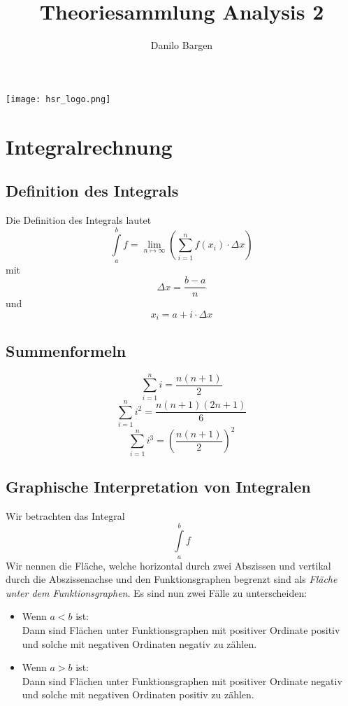 \documentclass[10pt,a4paper]{scrartcl}
\author{Danilo Bargen}
\title{Theoriesammlung Analysis 2}
\begin{document}
\begin{titlepage}
	\maketitle
	\vspace{120mm}
	\center\texttt{[image: hsr\_logo.png]}
	\thispagestyle{empty} %
\end{titlepage}

\tableofcontents\newpage

\section{Integralrechnung}

\subsection{Definition des Integrals}

Die Definition des Integrals lautet
$$\int\limits_a^b f = \lim_{n \mapsto \infty}\left(\sum_{i=1}^n f(x_i) \cdot \Delta x\right)$$
mit
$$\Delta x = \frac{b-a}{n}$$
und
$$x_i = a + i \cdot \Delta x$$


\subsection{Summenformeln}

$$\sum_{i=1}^n i = \frac{n(n+1)}{2}$$
$$\sum_{i=1}^n i^2 = \frac{n(n+1)(2n+1)}{6}$$
$$\sum_{i=1}^n i^3 = \left(\frac{n(n+1)}{2}\right)^2$$


\subsection{Graphische Interpretation von Integralen}

Wir betrachten das Integral
$$\int\limits_a^b f$$
Wir nennen die Fläche, welche horizontal durch zwei Abszissen und vertikal
durch die Abszissenachse und den Funktionsgraphen begrenzt sind als
\textit{Fläche unter dem Funktionsgraphen}. Es sind nun zwei Fälle zu unterscheiden:

\begin{itemize}
\item Wenn $a < b$ ist:\\
    Dann sind Flächen unter Funktionsgraphen mit positiver Ordinate positiv und
    solche mit negativen Ordinaten negativ zu zählen.
\item Wenn $a > b$ ist:\\
    Dann sind Flächen unter Funktionsgraphen mit positiver
    Ordinate negativ und solche mit negativen Ordinaten positiv zu zählen.
\end{itemize}
\end{document}
